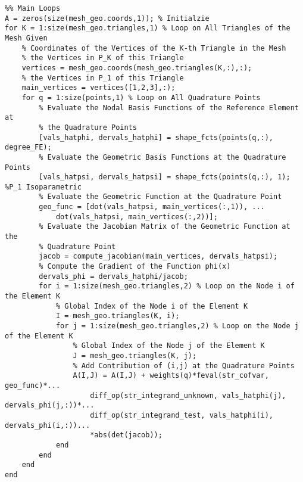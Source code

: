 \documentclass[11pt,a4paper,center,notitlepage]{article}
\numberwithin{equation}{section}
\begin{document}
\begin{verbatim}
%% Main Loops
A = zeros(size(mesh_geo.coords,1)); % Initialzie
for K = 1:size(mesh_geo.triangles,1) % Loop on All Triangles of the Mesh Given
    % Coordinates of the Vertices of the K-th Triangle in the Mesh
    % the Vertices in P_K of this Triangle
    vertices = mesh_geo.coords(mesh_geo.triangles(K,:),:);
    % the Vertices in P_1 of this Triangle
    main_vertices = vertices([1,2,3],:);
    for q = 1:size(points,1) % Loop on All Quadrature Points
        % Evaluate the Nodal Basis Functions of the Reference Element at
        % the Quadrature Points
        [vals_hatphi, dervals_hatphi] = shape_fcts(points(q,:), degree_FE);
        % Evaluate the Geometric Basis Functions at the Quadrature Points
        [vals_hatpsi, dervals_hatpsi] = shape_fcts(points(q,:), 1); %P_1 Isoparametric
        % Evaluate the Geometric Function at the Quadrature Point
        geo_func = [dot(vals_hatpsi, main_vertices(:,1)), ...
            dot(vals_hatpsi, main_vertices(:,2))];
        % Evaluate the Jacobian Matrix of the Geometric Function at the
        % Quadrature Point
        jacob = compute_jacobian(main_vertices, dervals_hatpsi);
        % Compute the Gradient of the Function phi(x)
        dervals_phi = dervals_hatphi/jacob;
        for i = 1:size(mesh_geo.triangles,2) % Loop on the Node i of the Element K
            % Global Index of the Node i of the Element K
            I = mesh_geo.triangles(K, i);
            for j = 1:size(mesh_geo.triangles,2) % Loop on the Node j of the Element K
                % Global Index of the Node j of the Element K
                J = mesh_geo.triangles(K, j);
                % Add Contribution of (i,j) at the Quadrature Points
                A(I,J) = A(I,J) + weights(q)*feval(str_cofvar, geo_func)*...
                    diff_op(str_integrand_unknown, vals_hatphi(j), dervals_phi(j,:))*...
                    diff_op(str_integrand_test, vals_hatphi(i), dervals_phi(i,:))...
                    *abs(det(jacob));
            end
        end
    end
end
\end{verbatim}
\end{document}
